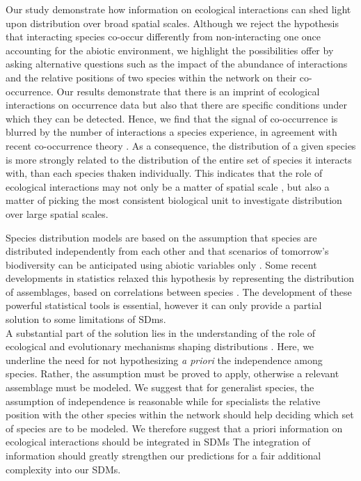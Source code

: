 Our study demonstrate how information on ecological interactions can
shed light upon distribution over broad spatial scales. Although we
reject the hypothesis that interacting species co-occur differently from
non-interacting one once accounting for the abiotic environment, we
highlight the possibilities offer by asking alternative questions such
as the impact of the abundance of interactions and the relative
positions of two species within the network on their co-occurrence. Our
results demonstrate that there is an imprint of ecological interactions
on occurrence data but also that there are specific conditions under
which they can be detected. Hence, we find that the signal of
co-occurrence is blurred by the number of interactions a species
experience, in agreement with recent co-occurrence theory
\citep{Cazelles2016}. As a consequence, the distribution of a given
species is more strongly related to the distribution of the entire set
of species it interacts with, than each species thaken individually.
This indicates that the role of ecological interactions may not only be
a matter of spatial scale \citep{McGill2010}, but also a matter of
picking the most consistent biological unit to investigate distribution
over large spatial scales.

Species distribution models are based on the assumption that species are
distributed independently from each other and that scenarios of
tomorrow's biodiversity can be anticipated using abiotic variables only
\citep{Jeschke2008}. Some recent developments in statistics relaxed this
hypothesis by representing the distribution of assemblages, based on
correlations between species \citep{Pollock2014, Warton2015b}. The
development of these powerful statistical tools is essential, however it
can only provide a partial solution to some limitations of SDms.\\
A substantial part of the solution lies in the understanding of the role
of ecological and evolutionary mechanisms shaping distributions
\citep{Thuiller2013}. Here, we underline the need for not hypothesizing
\emph{a priori} the independence among species. Rather, the assumption
must be proved to apply, otherwise a relevant assemblage must be
modeled. We suggest that for generalist species, the assumption of
independence is reasonable while for specialists the relative position
with the other species within the network should help deciding which set
of species are to be modeled. We therefore suggest that a priori
information on ecological interactions should be integrated in SDMs The
integration of information should greatly strengthen our predictions for
a fair additional complexity into our SDMs.

